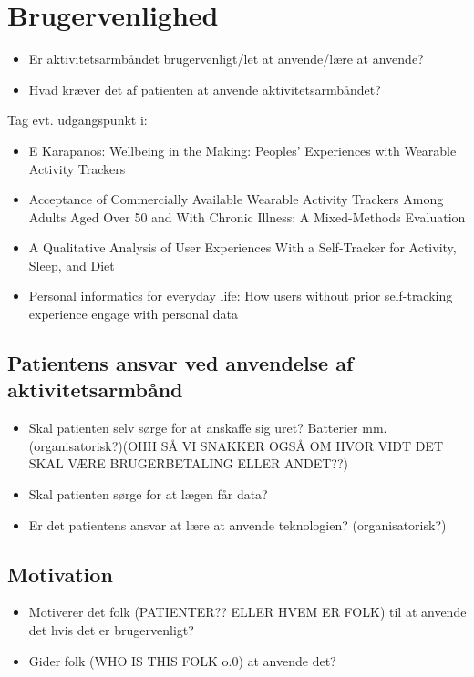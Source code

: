 \section{Brugervenlighed}
\begin{itemize}
\item Er aktivitetsarmbåndet brugervenligt/let at anvende/lære at anvende?
\item Hvad kræver det af patienten at anvende aktivitetsarmbåndet?
\end{itemize}
Tag evt. udgangspunkt i: 
\begin{itemize}
\item E Karapanos: Wellbeing in the Making: Peoples' Experiences with Wearable Activity Trackers
\item Acceptance of Commercially Available Wearable Activity Trackers Among Adults Aged Over 50 and With Chronic Illness: A Mixed-Methods Evaluation
\item A Qualitative Analysis of User Experiences With a Self-Tracker for Activity, Sleep, and Diet
\item Personal informatics for everyday life: How users without prior self-tracking experience engage with personal data
\end{itemize}

\subsection{Patientens ansvar ved anvendelse af aktivitetsarmbånd}
\begin{itemize}
\item Skal patienten selv sørge for at anskaffe sig uret? Batterier mm. (organisatorisk?)(OHH SÅ VI SNAKKER OGSÅ OM HVOR VIDT DET SKAL VÆRE BRUGERBETALING ELLER ANDET??)
\item Skal patienten sørge for at lægen får data?
\item Er det patientens ansvar at lære at anvende teknologien? (organisatorisk?)
\end{itemize}

\subsection{Motivation}
\begin{itemize}
\item Motiverer det folk (PATIENTER?? ELLER HVEM ER FOLK) til at anvende det hvis det er brugervenligt?
\item Gider folk (WHO IS THIS FOLK o.0) at anvende det?
\end{itemize}

